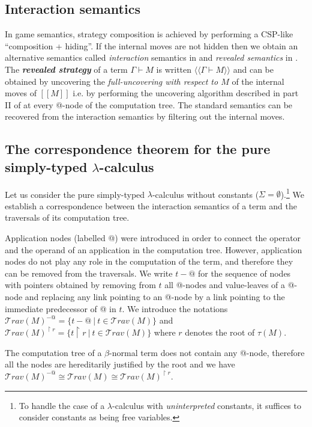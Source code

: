 \documentclass{llncs}
\newcommand\defname[1]{{\bf\em #1}\index{#1}}
\newcommand\travset{\mathcal{T}rav}
\newcommand{\lsem}{[\![} %
\newcommand{\rsem}{]\!]} %
\newcommand{\sem}[1]{{\lsem #1 \rsem}}
\newcommand{\intersem}[1]{{\langle\!\langle #1 \rangle\!\rangle}}
\begin{document}
\subsection{Interaction semantics}
\label{sec:interaction_semantics}

In game semantics, strategy composition is achieved by performing a
CSP-like ``composition + hiding''. If the internal moves are not hidden
then we obtain an alternative semantics called \emph{interaction}
semantics in \cite{DBLP:conf/sas/DimovskiGL05} and \emph{revealed
semantics} in \cite{willgreenlandthesis}.
The \defname{revealed strategy} of a term $\Gamma \vdash M$ is written $\intersem{\Gamma \vdash M}$ and
can be obtained by uncovering the \emph{full-uncovering with respect to $M$} of the internal moves of $\sem{M}$ i.e.
by performing the uncovering algorithm described in part II of \cite{hylandong_pcf} at every @-node of the computation tree.
The standard semantics can be recovered from the interaction semantics by filtering out the internal moves.


\subsection{The correspondence theorem for the pure simply-typed $\lambda$-calculus}

Let us consider the pure simply-typed $\lambda$-calculus without constants ($\Sigma = \emptyset$).\footnote{To handle the case of a $\lambda$-calculus with \emph{uninterpreted} constants, it suffices to
consider constants as being free variables.}
We establish a correspondence between the interaction semantics of a term
and the traversals of its computation tree.

Application nodes (labelled @) were introduced in order to connect the operator and
the operand of an application in the computation tree. However, application nodes do not play
any role in the computation of the term, and therefore
they can be removed from the traversals.
We write $t-@$ for the sequence of nodes with pointers obtained by
removing from $t$ all @-nodes and value-leaves of a @-node and
replacing any link pointing to an @-node by a link pointing to the immediate predecessor of @ in $t$.
We introduce the notations $\travset(M)^{-@} = \{ t - @ \ | \  t \in \travset(M) \}$ and $\travset(M)^{\upharpoonright r} = \{ t  \upharpoonright r \ | \  t  \in \travset(M) \}$ where $r$ denotes the root of $\tau(M)$.

\begin{remark}
The computation tree of a $\beta$-normal term does not contain any @-node, therefore all the nodes are
hereditarily justified by the root and we have $\travset(M)^{-@} \cong \travset(M) \cong  \travset(M)^{\upharpoonright r }$.
\end{remark}
\end{document}
